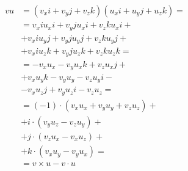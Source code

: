 \begin{align*}
    vu
    & = (v_x i + v_y j + v_z k) (u_x i + u_y j + u_z k) = \\
    & = v_x i u_x i + v_y j u_x i + v_z k u_x i + \\
    & + v_x i u_y j + v_y j u_y j + v_z k u_y j + \\
    & + v_x i u_z k + v_y j u_z k + v_z k u_z k = \\
    & = -v_x u_x - v_y u_x k + v_z u_x j + \\
    & + v_x u_y k - v_y u_y - v_z u_y i - \\
    & - v_x u_z j + v_y u_z i - v_z u_z = \\
    & = (-1) \cdot (v_x u_x + v_y u_y + v_z u_z) + \\
    & + i \cdot (v_y u_z - v_z u_y) + \\
    & + j \cdot (v_z u_x - v_x u_z) + \\
    & + k \cdot (v_x u_y - v_y u_x) = \\
    & = v \times u - v \cdot u
\end{align*}


